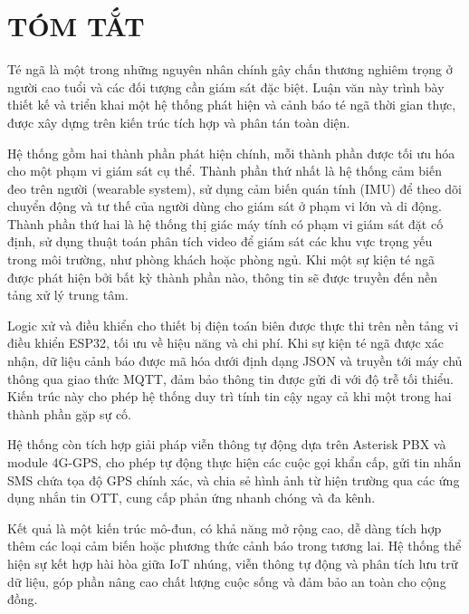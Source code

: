 
\chapter*{TÓM TẮT}

Té ngã là một trong những nguyên nhân chính gây chấn thương nghiêm trọng ở người cao tuổi và các đối tượng cần giám sát đặc biệt. Luận văn này trình bày thiết kế và triển khai một hệ thống phát hiện và cảnh báo té ngã thời gian thực, được xây dựng trên kiến trúc tích hợp và phân tán toàn diện.

Hệ thống gồm hai thành phần phát hiện chính, mỗi thành phần được tối ưu hóa cho một phạm vi giám sát cụ thể. Thành phần thứ nhất là hệ thống cảm biến đeo trên người (wearable system), sử dụng cảm biến quán tính (IMU) để theo dõi chuyển động và tư thế của người dùng cho giám sát ở phạm vi lớn và di động. Thành phần thứ hai là hệ thống thị giác máy tính có phạm vi giám sát đặt cố định, sử dụng thuật toán phân tích video để giám sát các khu vực trọng yếu trong môi trường, như phòng khách hoặc phòng ngủ. Khi một sự kiện té ngã được phát hiện bởi bất kỳ thành phần nào, thông tin sẽ được truyền đến nền tảng xử lý trung tâm.

Logic xử và điều khiển cho thiết bị điện toán biên được thực thi trên nền tảng vi điều khiển ESP32, tối ưu về hiệu năng và chi phí. Khi sự kiện té ngã được xác nhận, dữ liệu cảnh báo được mã hóa dưới định dạng JSON và truyền tới máy chủ thông qua giao thức MQTT, đảm bảo thông tin được gửi đi với độ trễ tối thiểu. Kiến trúc này cho phép hệ thống duy trì tính tin cậy ngay cả khi một trong hai thành phần gặp sự cố.

Hệ thống còn tích hợp giải pháp viễn thông tự động dựa trên Asterisk PBX và module 4G-GPS, cho phép tự động thực hiện các cuộc gọi khẩn cấp, gửi tin nhắn SMS chứa tọa độ GPS chính xác, và chia sẻ hình ảnh từ hiện trường qua các ứng dụng nhắn tin OTT, cung cấp phản ứng nhanh chóng và đa kênh.

Kết quả là một kiến trúc mô-đun, có khả năng mở rộng cao, dễ dàng tích hợp thêm các loại cảm biến hoặc phương thức cảnh báo trong tương lai. Hệ thống thể hiện sự kết hợp hài hòa giữa IoT nhúng, viễn thông tự động và phân tích lưu trữ dữ liệu, góp phần nâng cao chất lượng cuộc sống và đảm bảo an toàn cho cộng đồng.
